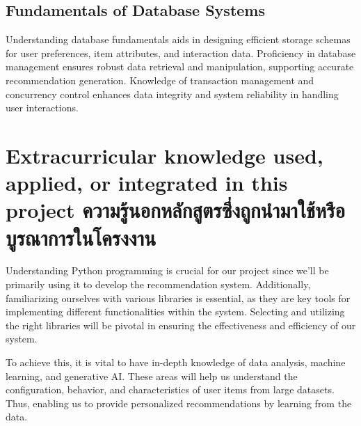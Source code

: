 \subsection{Fundamentals of Database Systems}

Understanding database fundamentals aids in designing efficient storage schemas for user 
preferences, item attributes, and interaction data. Proficiency in database management 
ensures robust data retrieval and manipulation, supporting accurate recommendation generation. 
Knowledge of transaction management and concurrency control enhances data integrity and 
system reliability in handling user interactions.

\section{\ifenglish%
Extracurricular knowledge used, applied, or integrated in this project
\else%
ความรู้นอกหลักสูตรซึ่งถูกนำมาใช้หรือบูรณาการในโครงงาน
\fi
}

Understanding Python programming is crucial for our project since we'll be primarily using it 
to develop the recommendation system. Additionally, familiarizing ourselves with various 
libraries is essential, as they are key tools for implementing different functionalities 
within the system. Selecting and utilizing the right libraries will be pivotal in ensuring 
the effectiveness and efficiency of our system.

To achieve this, it is vital to have in-depth knowledge of data analysis, machine learning, 
and generative AI. These areas will help us understand the configuration, behavior, and 
characteristics of user items from large datasets. Thus, enabling us to provide personalized 
recommendations by learning from the data.